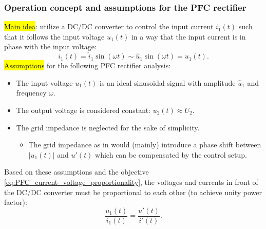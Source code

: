 \begin{frame}
    \frametitle{Operation concept and assumptions for the PFC rectifier} 
    \hl{Main idea}: utilize a DC/DC converter to control the input current $i_1(t)$ such that it follows the input voltage $u_1(t)$ in a way that the input current is in phase with the input voltage:
    \begin{equation}
        i_1(t) = \hat{i}_1 \sin(\omega t) \sim  \hat{u}_1 \sin(\omega t) = u_1(t).
        \label{eq:PFC_current_voltage_proportionality}
    \end{equation}
    \hl{Assumptions} for the following PFC rectifier analysis:
    \begin{itemize}
        \item The input voltage $u_1(t)$ is an ideal sinusoidal signal with amplitude $\hat{u}_1$ and frequency $\omega$.
        \item The output voltage is considered constant: $u_2(t)\approx U_2$.
        \item The grid impedance is neglected for the sake of simplicity.
        \begin{itemize}
            \item The grid impedance as in  would (mainly) introduce a phase shift between $|u_1(t)|$ and $u'(t)$ which can be compensated by the control setup. 
        \end{itemize}
    \end{itemize}
    Based on these assumptions and the objective \eqref{eq:PFC_current_voltage_proportionality}, the voltages and currents in front of the DC/DC converter must be proportional to each other (to achieve unity power factor):
    \begin{equation}
        \frac{u_1(t)}{i_1(t)} = \frac{u'(t)}{i'(t)}.
    \end{equation}
\end{frame}

